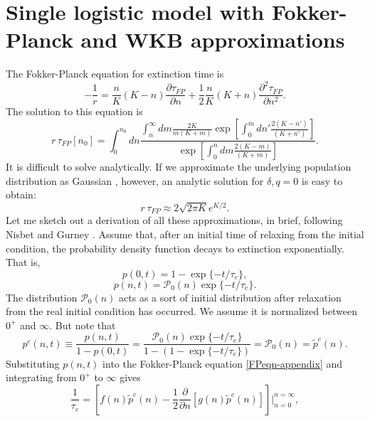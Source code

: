 \section*{Single logistic model with Fokker-Planck and WKB approximations}
The Fokker-Planck equation for extinction time is \cite{Nisbet1982}
\begin{equation}
-\frac{1}{r} = \frac{n}{K}(K-n)\frac{\partial\tau_{FP}}{\partial n}+\frac{1}{2}\frac{n}{K}(K+n)\frac{\partial^2\tau_{FP}}{\partial n^2}. 
 \label{FPeqn-appendix} 
\end{equation}
The solution to this equation is
\begin{equation}%
r\,\tau_{FP}[n_0] = \int^{n_0}_0 dn\frac{\int_n^\infty dm\frac{2K}{m(K+m)}\exp[\int^m_0dn'\frac{2(K-n')}{(K+n')}]}{\exp[\int^n_0dm\frac{2(K-m)}{(K+m)}]}.  
\end{equation}
It is difficult to solve analytically. 
If we approximate the underlying population distribution as Gaussian \cite{Nisbet1982}, however, an analytic solution for $\delta,q=0$ is easy to obtain:
\begin{equation}
r\,\tau_{FP} \approx 2\sqrt{2\pi K}e^{K/2}. 
 \label{tau-fp-gauss-appendix}
\end{equation}
Let me sketch out a derivation of all these approximations, in brief, following Nisbet and Gurney \cite{Nisbet1982}. 
Assume that, after an initial time of relaxing from the initial condition, the probability density function decays to extinction exponentially. That is,
\begin{equation}
p(0,t) = 1 - \exp\{-t/\tau_e\},
\end{equation}
\begin{equation}
p(n,t) = \mathcal{P}_0(n)\exp\{-t/\tau_e\}.
\end{equation}
The distribution $\mathcal{P}_0(n)$ acts as a sort of initial distribution after relaxation from the real initial condition has occurred.  We assume it is normalized between $0^+$ and $\infty$. But note that
\begin{equation}
p^c(n,t) \equiv \frac{p(n,t)}{1-p(0,t)}
= \frac{\mathcal{P}_0(n)\exp\{-t/\tau_e\}}{1-\left(1-\exp\{-t/\tau_e\}\right)}
= \mathcal{P}_0(n)
= \widetilde{p}^c(n).  
\end{equation}
Substituting $p(n,t)$ into the Fokker-Planck equation \ref{FPeqn-appendix} and integrating from $0^+$ to $\infty$ gives
\begin{equation}
\frac{1}{\tau_e} = \left[f(n)\widetilde{p}^c(n) - \frac{1}{2}\frac{\partial}{\partial n}[g(n)\widetilde{p}^c(n)]\right]\Bigg\vert^{n=\infty}_{n=0},
\end{equation}
